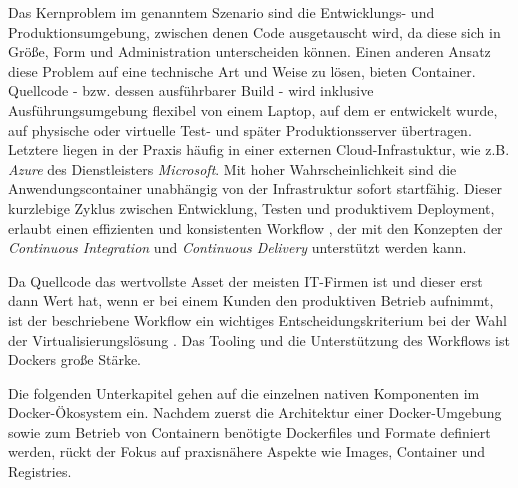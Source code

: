 \documentclass[../main.tex]{subfiles}
\begin{document}
    Das Kernproblem im genanntem Szenario sind die Entwicklungs- und Produktionsumgebung, zwischen denen Code ausgetauscht wird, da diese sich in Größe, Form und Administration unterscheiden können. Einen anderen Ansatz diese Problem auf eine technische Art und Weise zu lösen, bieten Container. Quellcode - bzw. dessen ausführbarer Build - wird inklusive Ausführungsumgebung flexibel von einem Laptop, auf dem er entwickelt wurde, auf physische oder virtuelle Test- und später Produktionsserver übertragen. Letztere liegen in der Praxis häufig in einer externen Cloud-Infrastuktur, wie z.B. \emph{Azure} des Dienstleisters \emph{Microsoft}. Mit hoher Wahrscheinlichkeit sind die Anwendungscontainer unabhängig von der Infrastruktur sofort startfähig. Dieser kurzlebige Zyklus zwischen Entwicklung, Testen und produktivem Deployment, erlaubt einen effizienten und konsistenten Workflow \cite[S.8+12]{dockerBook}, der mit den Konzepten der \emph{Continuous Integration} und \emph{Continuous Delivery} unterstützt werden kann.

    Da Quellcode das wertvollste Asset der meisten \acrshort{IT}-Firmen ist und dieser erst dann Wert hat, wenn er bei einem Kunden den produktiven Betrieb aufnimmt, ist der beschriebene Workflow ein wichtiges Entscheidungskriterium bei der Wahl der Virtualisierungslösung \cite[S.1]{dockerIntroIEEE}. Das Tooling und die Unterstützung des Workflows ist Dockers große Stärke.


		Die folgenden Unterkapitel gehen auf die einzelnen nativen Komponenten im Docker-Ökosystem ein. Nachdem zuerst die Architektur einer Docker-Umgebung sowie zum Betrieb von Containern benötigte Dockerfiles und Formate definiert werden, rückt der Fokus auf praxisnähere Aspekte wie Images, Container und Registries.


\end{document}
